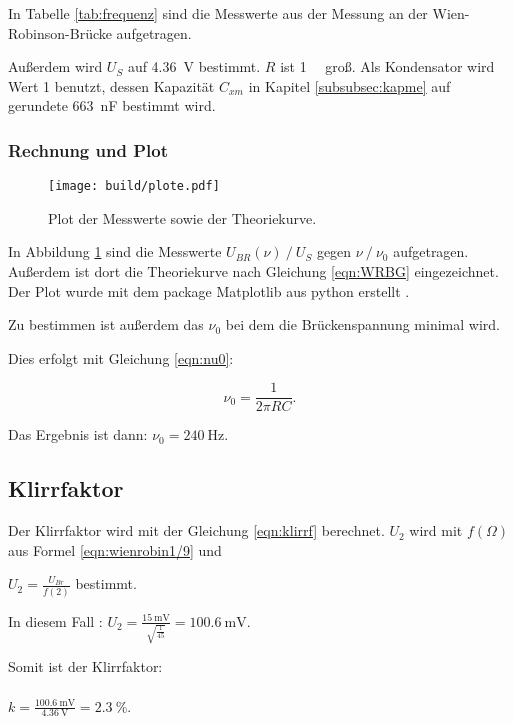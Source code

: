 In Tabelle \ref{tab:frequenz} sind die Messwerte aus der Messung an der
Wien-Robinson-Brücke aufgetragen.

Außerdem wird $U_S$ auf \SI{4.36}{\volt} bestimmt. $R$ ist \SI{1}{\kilo\Omega}
groß. Als Kondensator wird Wert 1 benutzt, dessen Kapazität $C_{xm}$ in Kapitel
\ref{subsubsec:kapme} auf gerundete \SI{663}{\nano\farad} bestimmt wird.

\FloatBarrier

\subsubsection{Rechnung und Plot}

\begin{figure}[h]
  \centering
  \texttt{[image: build/plote.pdf]}
  \caption{Plot der Messwerte sowie der Theoriekurve.}
  \label{fig:WRBplot}
\end{figure}

In Abbildung \ref{fig:WRBplot} sind die Messwerte $U_{BR}(\nu) \ /\ U_S$ gegen
$\nu \ /\ \nu_0$ aufgetragen. Außerdem ist dort die Theoriekurve nach Gleichung
\eqref{eqn:WRBG} eingezeichnet. Der Plot wurde mit dem package Matplotlib aus
python erstellt \cite{matplotlib}.

Zu bestimmen ist außerdem das $\nu_0$ bei dem die Brückenspannung minimal wird.

Dies erfolgt mit Gleichung \eqref{eqn:nu0}:

\begin{equation}
  \nu_0 = \frac{1}{2 \pi R C}.
  \label{eqn:nu0}
\end{equation}

Das Ergebnis ist dann: $\nu_0 = \SI{240}{\hertz}$.

\subsection{Klirrfaktor}

Der Klirrfaktor wird mit der Gleichung \eqref{eqn:klirrf} berechnet.
$U_2$ wird mit $f(\Omega)$ aus Formel \eqref{eqn:wienrobin1/9} und

$U_2 = \frac{U_{Br}}{f(2)}$ bestimmt.

In diesem Fall : $U_2 = \frac{\SI{15}{\milli\volt}}{\sqrt{\frac{1}{45}}} =
\SI{100.6}{\milli\volt}$.

Somit ist der Klirrfaktor:\\
\\$k = \frac{\SI{100.6}{\milli\volt}}{\SI{4.36}{\volt}} = \SI{2.3}{\percent}$.
